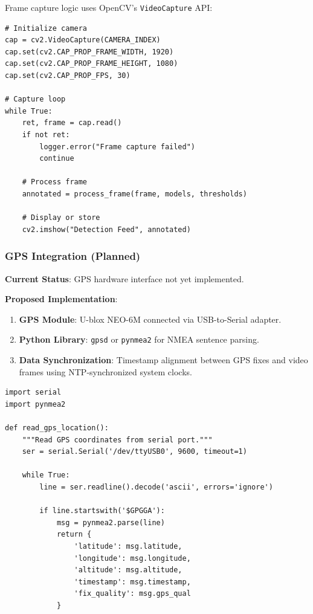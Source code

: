 \documentclass[12pt]{article}
\begin{document}
Frame capture logic uses OpenCV's \texttt{VideoCapture} API:

\begin{lstlisting}[caption={Camera Frame Capture}, label={lst:camera-capture}]
# Initialize camera
cap = cv2.VideoCapture(CAMERA_INDEX)
cap.set(cv2.CAP_PROP_FRAME_WIDTH, 1920)
cap.set(cv2.CAP_PROP_FRAME_HEIGHT, 1080)
cap.set(cv2.CAP_PROP_FPS, 30)

# Capture loop
while True:
    ret, frame = cap.read()
    if not ret:
        logger.error("Frame capture failed")
        continue
    
    # Process frame
    annotated = process_frame(frame, models, thresholds)
    
    # Display or store
    cv2.imshow("Detection Feed", annotated)
\end{lstlisting}

\subsubsection*{GPS Integration (Planned)}

\textbf{Current Status}: GPS hardware interface not yet implemented.

\medskip

\textbf{Proposed Implementation}:

\begin{enumerate}
    \item \textbf{GPS Module}: U-blox NEO-6M connected via USB-to-Serial adapter.
    \item \textbf{Python Library}: \texttt{gpsd} or \texttt{pynmea2} for NMEA sentence parsing.
    \item \textbf{Data Synchronization}: Timestamp alignment between GPS fixes and video frames using NTP-synchronized system clocks.
\end{enumerate}

\begin{lstlisting}[caption={GPS Data Acquisition (Conceptual)}, label={lst:gps-acquisition}]
import serial
import pynmea2

def read_gps_location():
    """Read GPS coordinates from serial port."""
    ser = serial.Serial('/dev/ttyUSB0', 9600, timeout=1)
    
    while True:
        line = ser.readline().decode('ascii', errors='ignore')
        
        if line.startswith('$GPGGA'):
            msg = pynmea2.parse(line)
            return {
                'latitude': msg.latitude,
                'longitude': msg.longitude,
                'altitude': msg.altitude,
                'timestamp': msg.timestamp,
                'fix_quality': msg.gps_qual
            }
\end{lstlisting}
\end{document}
